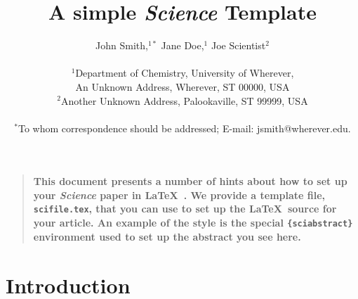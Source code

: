\documentclass[12pt]{article}
\title{A simple {\it Science\/} Template}
\author
{John Smith,$^{1\ast}$ Jane Doe,$^{1}$ Joe Scientist$^{2}$\\
\\
\normalsize{$^{1}$Department of Chemistry, University of Wherever,}\\
\normalsize{An Unknown Address, Wherever, ST 00000, USA}\\
\normalsize{$^{2}$Another Unknown Address, Palookaville, ST 99999, USA}\\
\\
\normalsize{$^\ast$To whom correspondence should be addressed; E-mail:  jsmith@wherever.edu.}
}
\date{}
\newenvironment{sciabstract}{%
\begin{quote} \bf}
{\end{quote}}
\begin{document}
 


\baselineskip24pt


\maketitle 




\begin{sciabstract}
  This document presents a number of hints about how to set up your
  {\it Science\/} paper in \LaTeX\ .  We provide a template file,
  \texttt{scifile.tex}, that you can use to set up the \LaTeX\ source
  for your article.  An example of the style is the special
  \texttt{\{sciabstract\}} environment used to set up the abstract you
  see here.
\end{sciabstract}




\section*{Introduction}
\end{document}
